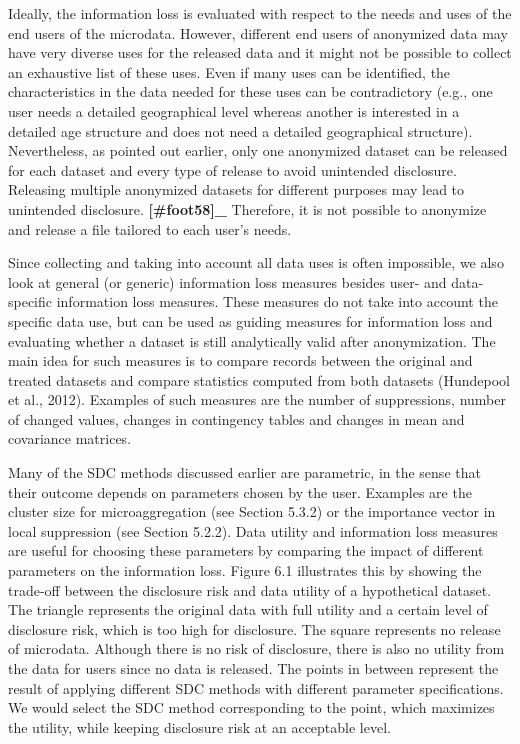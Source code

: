 \documentclass[letterpaper,10pt,english]{sphinxmanual}
\begin{document}
Ideally, the information loss is evaluated with respect to the needs and
uses of the end users of the microdata. However, different end users of
anonymized data may have very diverse uses for the released data and it
might not be possible to collect an exhaustive list of these uses. Even
if many uses can be identified, the characteristics in the data needed
for these uses can be contradictory (e.g., one user needs a detailed
geographical level whereas another is interested in a detailed age
structure and does not need a detailed geographical structure).
Nevertheless, as pointed out earlier, only one anonymized dataset can be
released for each dataset and every type of release to avoid unintended
disclosure. Releasing multiple anonymized datasets for different
purposes may lead to unintended disclosure. {\color{red}\bfseries{}{[}\#foot58{]}\_}
Therefore, it is not possible to anonymize and release a file tailored
to each user’s needs.

Since collecting and taking into account all data uses is often
impossible, we also look at general (or generic) information loss
measures besides user- and data-specific information loss measures.
These measures do not take into account the specific data use, but can
be used as guiding measures for information loss and evaluating whether
a dataset is still analytically valid after anonymization. The main idea
for such measures is to compare records between the original and treated
datasets and compare statistics computed from both datasets (Hundepool
et al., 2012). Examples of such measures are the number of suppressions,
number of changed values, changes in contingency tables and changes in
mean and covariance matrices.

Many of the SDC methods discussed earlier are parametric, in the sense
that their outcome depends on parameters chosen by the user. Examples
are the cluster size for microaggregation (see Section 5.3.2) or the
importance vector in local suppression (see Section 5.2.2). Data utility
and information loss measures are useful for choosing these parameters
by comparing the impact of different parameters on the information loss.
Figure 6.1 illustrates this by showing the trade-off between the
disclosure risk and data utility of a hypothetical dataset. The triangle
represents the original data with full utility and a certain level of
disclosure risk, which is too high for disclosure. The square represents
no release of microdata. Although there is no risk of disclosure, there
is also no utility from the data for users since no data is released.
The points in between represent the result of applying different SDC
methods with different parameter specifications. We would select the SDC
method corresponding to the point, which maximizes the utility, while
keeping disclosure risk at an acceptable level.
\end{document}
